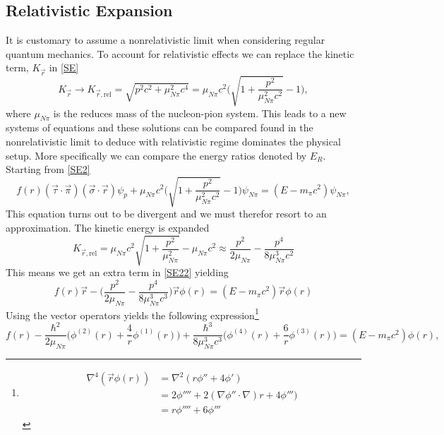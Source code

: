 \subsection{Relativistic Expansion}
 It is customary to assume a nonrelativistic limit when considering regular quantum mechanics. To account for relativistic effects we can replace the kinetic term, $K_{\vec{r}}$ in \eqref{SE}
 \begin{equation}
     K_{\vec{r}}\rightarrow K_{\vec{r},\text{rel}} = \sqrt{p^2 c^2+\mu_{N\pi}^2 c^4} = \mu_{N\pi} c^2 \bigg(\sqrt{1+\frac{p^2}{\mu_{N\pi}^2 c^2}}-1 \bigg),
 \end{equation}
 where $\mu_{N\pi}$ is the reduces mass of the nucleon-pion system. This leads to a new systems of equations and these solutions can be compared found in the nonrelativistic limit to deduce with relativistic regime dominates the physical setup. More specifically we can compare the energy ratios denoted by $E_R$. Starting from \eqref{SE2}
 \begin{equation}
     f(r) (\vec{\tau} \cdot \vec{\pi})(\vec{\sigma}\cdot \vec{r})\psi_p + \mu_{N\pi} c^2 \bigg(\sqrt{1+\frac{p^2}{\mu_{N\pi}^2 c^2}}-1 \bigg)\psi_{N\pi} = (E-m_{\pi}c^2)\psi_{N\pi},
 \end{equation}
 This equation turns out to be divergent and we must therefor resort to an approximation. The kinetic energy is expanded
 \begin{equation}
     K_{\vec{r},\text{rel}} = \mu_{N\pi} c^2\sqrt{1+\frac{p^2}{\mu_{N\pi}^2}}-\mu_{N\pi} c^2 \approx \frac{p^2}{2\mu_{N\pi}}-\frac{p^4}{8\mu_{N\pi}^3 c^2}
 \end{equation}
 This means we get an extra term in \eqref{SE22} yielding
 \begin{equation}
     f(r)\vec{r}-\bigg( \frac{p^2}{2\mu_{N\pi}}-\frac{p^4}{8\mu_{N\pi}^3 c^3} \bigg)\vec{r}\phi(r) = (E-m_\pi c^2)\vec{r}\phi(r)
 \end{equation}
 Using the vector operators yields the following expression\footnote{\begin{align*}
     \nabla^4(\vec{r}\phi(r))&=\nabla^2(r\phi''+4\phi') \\
     &= 2\phi''''+2(\nabla\phi''\cdot\nabla)r+4\phi''') \\
     &=r\phi''''+6\phi'''
 \end{align*}}
 \begin{equation}
    f(r)-\frac{\hbar^2}{2\mu_{N\pi}}\bigg( \phi^{(2)}(r)+\frac{4}{r}\phi^{(1)}(r) \bigg)+\frac{\hbar^3}{8\mu_{N\pi}^3 c^3}\bigg(\phi^{(4)}(r)+\frac{6}{r}\phi^{(3)}(r)\bigg)=(E-m_\pi c^2)\phi(r),
 \end{equation}

